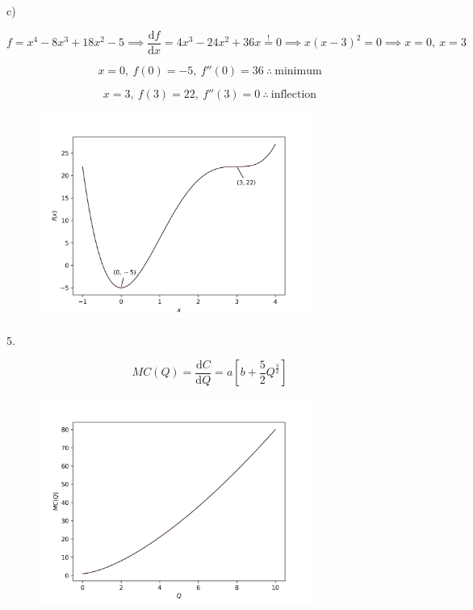 \documentclass{article}
\newcommand{\dd}[1]{\mathrm{d}#1}
\begin{document}
c)

$$
  f = x^4 - 8x^3 + 18x^2 -5 \implies \frac{\dd f}{\dd x} = 4x^3 - 24x^2 + 36x \overset{!}{=} 0 \implies x(x-3)^2 = 0 \implies x = 0, \: x = 3
$$

$$
  x = 0, \: f(0) = -5, \: f''(0) = 36 \: \therefore \: \text{minimum}
$$

$$
  x = 3, \: f(3) = 22, \: f''(3) = 0 \: \therefore \: \text{inflection}
$$

\begin{figure}[H]
  \centering
  \includegraphics[width=0.8\textwidth]{figures/5_Differentiation/QQ4c.png}
\end{figure}


5.

$$
  MC(Q) = \frac{\dd C}{\dd Q} = a\left[ b+\frac{5}{2}Q^{\frac{3}{2}}  \right]
$$

\begin{figure}[H]
  \centering
  \includegraphics[width=0.8\textwidth]{figures/5_Differentiation/QQ5.png}
\end{figure}
\end{document}
